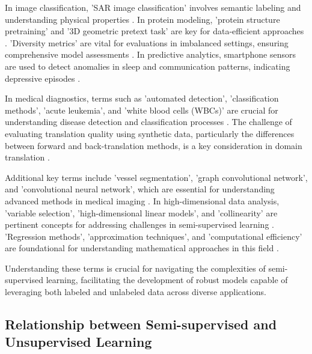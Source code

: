 In image classification, 'SAR image classification' involves semantic labeling and understanding physical properties \cite{huang2022physicallyexplainablecnnsar}. In protein modeling, 'protein structure pretraining' and '3D geometric pretext task' are key for data-efficient approaches \cite{huang2023dataefficientprotein3dgeometric}. 'Diversity metrics' are vital for evaluations in imbalanced settings, ensuring comprehensive model assessments \cite{pasarkar2024cousinsvendiscorefamily}. In predictive analytics, smartphone sensors are used to detect anomalies in sleep and communication patterns, indicating depressive episodes \cite{jeong2016predictiveanalyticsusingsmartphone}.



In medical diagnostics, terms such as 'automated detection', 'classification methods', 'acute leukemia', and 'white blood cells (WBCs)' are crucial for understanding disease detection and classification processes \cite{zolfaghari2023surveyautomateddetectionclassification}. The challenge of evaluating translation quality using synthetic data, particularly the differences between forward and back-translation methods, is a key consideration in domain translation \cite{bogoychev2020domaintranslationesenoisesynthetic}.



Additional key terms include 'vessel segmentation', 'graph convolutional network', and 'convolutional neural network', which are essential for understanding advanced methods in medical imaging \cite{shin2018deepvesselsegmentationlearning}. In high-dimensional data analysis, 'variable selection', 'high-dimensional linear models', and 'collinearity' are pertinent concepts for addressing challenges in semi-supervised learning \cite{williams2018nonpenalizedvariableselectionhighdimensional}. 'Regression methods', 'approximation techniques', and 'computational efficiency' are foundational for understanding mathematical approaches in this field \cite{kun2022mathematicalfoundationsregressionmethods}.



Understanding these terms is crucial for navigating the complexities of semi-supervised learning, facilitating the development of robust models capable of leveraging both labeled and unlabeled data across diverse applications.



\subsection{Relationship between Semi-supervised and Unsupervised Learning} \label{subsec:Relationship between Semi-supervised and Unsupervised Learning}

